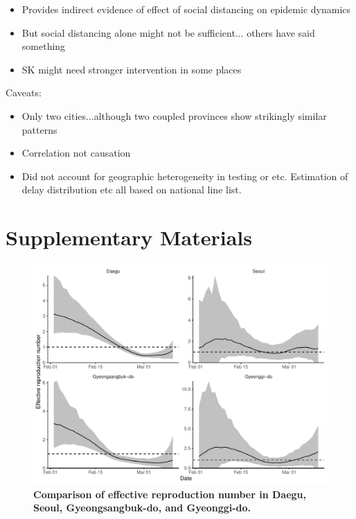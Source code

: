 \documentclass[12pt]{article}
\begin{document}
\begin{itemize}
  \item Provides indirect evidence of effect of social distancing on epidemic dynamics
  \item But social distancing alone might not be sufficient... others have said something
  \item SK might need stronger intervention in some places
\end{itemize}

Caveats:
\begin{itemize}
  \item Only two cities...although two coupled provinces show strikingly similar patterns
  \item Correlation not causation
  \item Did not account for geographic heterogeneity in testing or etc. Estimation of delay distribution etc all based on national line list.
\end{itemize}

\pagebreak

\section{Supplementary Materials}

\begin{figure}[!ht]
\includegraphics[width=\textwidth]{figure_R_t_all.pdf}
\caption{
\textbf{Comparison of effective reproduction number in Daegu, Seoul, Gyeongsangbuk-do, and Gyeonggi-do.}
}
\label{fig:eff}
\end{figure}
\end{document}
